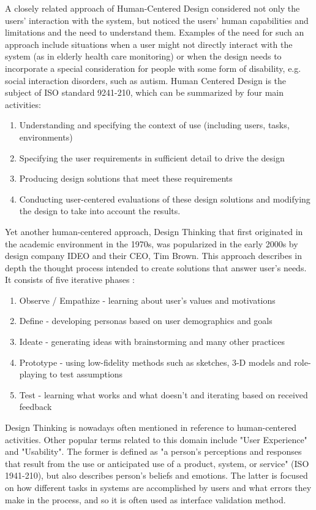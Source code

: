 \documentclass{article}
\begin{document}
A closely related approach of Human-Centered Design considered not only the users' interaction with the system, but noticed the users' human capabilities and limitations and the need to understand them. Examples of the need for such an approach include situations when a user might not directly interact with the system (as in elderly health care monitoring) or when the design needs to incorporate a special consideration for people with some form of disability, e.g. social interaction disorders, such as autism. Human Centered Design is the subject of ISO standard 9241-210, which can be summarized by four main activities:
\begin{enumerate}
  \item Understanding and specifying the context of use (including users, tasks, environments)
  \item Specifying the user requirements in sufficient detail to drive the design
  \item Producing design solutions that meet these requirements
  \item Conducting user-centered evaluations of these design solutions and modifying the design to take into account the results.
\end{enumerate}

Yet another human-centered approach, Design Thinking that first originated in the academic environment in the 1970s, was popularized in the early 2000s by design company IDEO and their CEO, Tim Brown. This approach describes in depth the thought process intended to create solutions that answer user's needs. It consists of five iterative phases \citep{brown2009change}:
\begin{enumerate}
    \item Observe / Empathize - learning about user's values and motivations
    \item Define - developing personas based on user demographics and goals
    \item Ideate - generating ideas with brainstorming and many other practices
    \item Prototype - using low-fidelity methods such as sketches, 3-D models and role-playing to test assumptions
    \item Test - learning what works and what doesn't and iterating based on received feedback
\end{enumerate}
Design Thinking is nowadays often mentioned in reference to human-centered activities. Other popular terms related to this domain include "User Experience" and "Usability". The former is defined as "a person's perceptions and responses that result from the use or anticipated use of a product, system, or service" (ISO 1941-210), but also describes person's beliefs and emotions. The latter is focused on how different tasks in systems are accomplished by users and what errors they make in the process, and so it is often used as interface validation method. 
\end{document}
